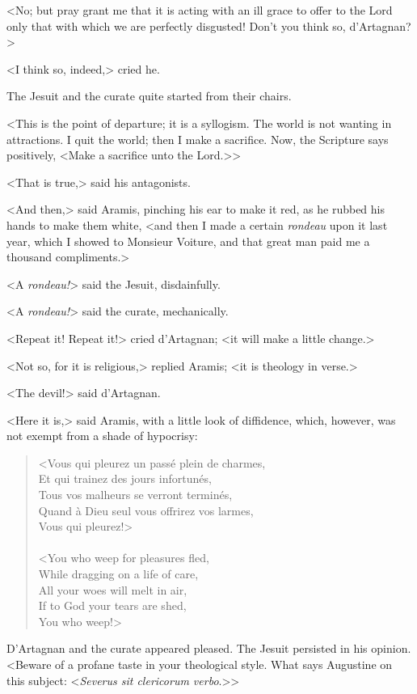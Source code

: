 <No; but pray grant me that it is acting with an ill grace to offer to the Lord only that with which we are perfectly disgusted! Don't you think so, d'Artagnan?> 

<I think so, indeed,> cried he. 

The Jesuit and the curate quite started from their chairs. 

<This is the point of departure; it is a syllogism. The world is not wanting in attractions. I quit the world; then I make a sacrifice. Now, the Scripture says positively, <Make a sacrifice unto the Lord.>> 

<That is true,> said his antagonists. 

<And then,> said Aramis, pinching his ear to make it red, as he rubbed his hands to make them white, <and then I made a certain \textit{rondeau} upon it last year, which I showed to Monsieur Voiture, and that great man paid me a thousand compliments.> 

<A \textit{rondeau!}> said the Jesuit, disdainfully. 

<A \textit{rondeau!}> said the curate, mechanically. 

<Repeat it! Repeat it!> cried d'Artagnan; <it will make a little change.> 

<Not so, for it is religious,> replied Aramis; <it is theology in verse.> 

<The devil!> said d'Artagnan. 

<Here it is,> said Aramis, with a little look of diffidence, which, however, was not exempt from a shade of hypocrisy: 

\begin{verse}
<Vous qui pleurez un passé plein de charmes,\\
Et qui trainez des jours infortunés,\\
Tous vos malheurs se verront terminés,\\
Quand à Dieu seul vous offrirez vos larmes,\\
Vous qui pleurez!>\\
~\\
<You who weep for pleasures fled,\\
While dragging on a life of care,\\
All your woes will melt in air,\\
If to God your tears are shed,\\
You who weep!>
\end{verse}

D'Artagnan and the curate appeared pleased. The Jesuit persisted in his opinion. <Beware of a profane taste in your theological style. What says Augustine on this subject: <\textit{Severus sit clericorum verbo}.>> 

